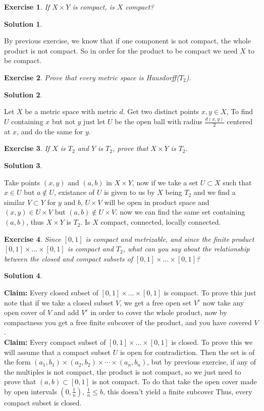 \documentclass[11pt,a4paper]{article}
\newtheorem{Ex}{Exercise}
\newtheorem{Sol}{Solution}
\begin{document}
\begin{Ex}
If $X \times Y$ is compact, is $X$ compact?
\end{Ex}
\begin{Sol}\end{Sol}
\noindent By previous exercise, we know that if one component is not compact, the whole product is not compact. So in order for the product to be compact we need $X$ to be compact.

\begin{Ex}
	Prove that every metric space is Hausdorff($T_2$).
\end{Ex}
\begin{Sol}\end{Sol}
\noindent Let $X$ be a metric space with metric $d$. Get two distinct points $x,y \in X$, To find $U$ containing $x$ but not $y$ just let $U$ be the open ball with radius $\frac{d(x,y)}{2}$ centered at $x$, and do the same for $y$. 

\begin{Ex}
	If $X$ is $T_2$ and $Y$ is $T_2$, prove that $X \times Y$ is $T_2$.
\end{Ex}
\begin{Sol}\end{Sol}
\noindent Take points $(x,y)$ and $(a,b)$ in $X \times Y$, now if we take a set $U \subset X$ such that $x \in U$ but $a \not \in U$, existance of $U$ is given to us by $X$ being $T_2$ and we find a similar $V \subset Y$ for $y$ and $b$, $U \times V$ will be open in product space and $(x,y) \in U \times V$ but $(a,b) \not \in U \times V$. now we can find the same set containing $(a,b)$, thus $X \times Y$ is $T_2$. Is $X$ compact, connected, locally connected.

\begin{Ex}
	Since $[0,1]$ is compact and metrizable, and since the finite product $[0,1] \times \dots \times [0,1]$ is compact and $T_2$, what can you say about the relationship between the closed and compact subsets of $[0,1] \times \dots \times [0,1]$?   
\end{Ex}

\begin{Sol}\end{Sol}
\noindent \textbf{Claim: }Every closed subset of $[0,1] \times \dots \times [0,1]$ is compact. To prove this just note that if we take a closed subset $V$, we get a free open set $V^c$ now take any open cover of $V$ and add $V^c$ in order to cover the whole product, now by compactness you get a free finite subcover of the product, and you have covered $V$. \\
\textbf{Claim: }Every compact subset of $[0,1] \times \dots \times [0,1]$ is closed. To prove this we will assume that a compact subset $U$ is open for contradiction. Then the set is of the form $(a_1,b_1) \times (a_2,b_2) \times \cdots \times (a_n,b_n)$, but by previous exercise, if any of the multiples is not compact, the product is not compact, so we just need to prove that $(a,b) \subset [0,1]$ is not compact. To do that take the open cover made by open intervals $(0,\frac{1}{n})$, $\frac{1}{n}\le b$, this doesn't yield a finite subcover Thus, every compact subset is closed.
\end{document}
